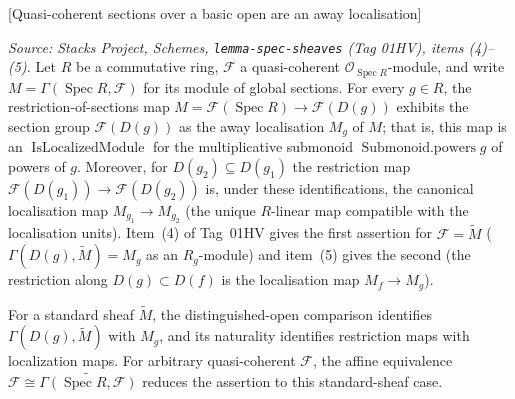 \begin{definition}

[Quasi-coherent sections over a basic open are an away localisation]
  \label{mk-def:qcoh_sections_localized}

  \textit{Source: Stacks Project, Schemes, \texttt{lemma-spec-sheaves} (Tag 01HV),
  items (4)--(5).}
  Let \(R\) be a commutative ring, \(\mathcal{F}\) a quasi-coherent
  \(\mathcal{O}_{\operatorname{Spec} R}\)-module, and write
  \(M = \Gamma(\operatorname{Spec} R, \mathcal{F})\) for its module of global
  sections. For every \(g \in R\), the restriction-of-sections map
  \(M = \mathcal{F}(\operatorname{Spec} R) \to \mathcal{F}(D(g))\) exhibits the
  section group \(\mathcal{F}(D(g))\) as the away localisation \(M_g\) of \(M\); that
  is, this map is an \(\operatorname{IsLocalizedModule}\) for the multiplicative
  submonoid \(\operatorname{Submonoid.powers} g\) of powers of \(g\). Moreover, for
  \(D(g_2) \subseteq D(g_1)\) the restriction map
  \(\mathcal{F}(D(g_1)) \to \mathcal{F}(D(g_2))\) is, under these identifications, the
  canonical localisation map \(M_{g_1} \to M_{g_2}\) (the unique \(R\)-linear map
  compatible with the localisation units). Item~(4) of Tag~01HV gives the first
  assertion for \(\mathcal{F} = \widetilde{M}\) (\(\Gamma(D(g), \widetilde{M}) = M_g\)
  as an \(R_g\)-module) and item~(5) gives the second (the restriction along
  \(D(g) \subset D(f)\) is the localisation map \(M_f \to M_g\)).

  For a standard sheaf \(\widetilde M\), the distinguished-open comparison identifies
  \(\Gamma(D(g),\widetilde M)\) with \(M_g\), and its naturality identifies restriction
  maps with localization maps. For arbitrary quasi-coherent \(\mathcal F\), the affine
  equivalence
  \(\mathcal{F} \cong \widetilde{\Gamma(\operatorname{Spec} R,\mathcal{F})}\)
  reduces the assertion to this standard-sheaf case.


\end{definition}
